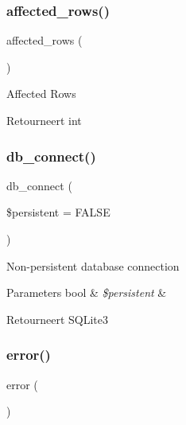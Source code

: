 \subsubsection{\texorpdfstring{affected\_rows()}{affected\_rows()}}
{\footnotesize\ttfamily affected\+\_\+rows (\begin{DoxyParamCaption}{ }\end{DoxyParamCaption})}

Affected Rows

\begin{DoxyReturn}{Retourneert}
int 
\end{DoxyReturn}
\mbox{\label{class_c_i___d_b__sqlite3__driver_a52bf595e79e96cc0a7c907a9b45aeb4d}} 
\subsubsection{\texorpdfstring{db\_connect()}{db\_connect()}}
{\footnotesize\ttfamily db\+\_\+connect (\begin{DoxyParamCaption}\item[{}]{\$persistent = {\ttfamily FALSE} }\end{DoxyParamCaption})}

Non-\/persistent database connection


\begin{DoxyParams}[1]{Parameters}
bool & {\em \$persistent} & \\
\hline
\end{DoxyParams}
\begin{DoxyReturn}{Retourneert}
S\+Q\+Lite3 
\end{DoxyReturn}
\mbox{\label{class_c_i___d_b__sqlite3__driver_a43b8d30b879d4f09ceb059b02af2bc02}} 
\subsubsection{\texorpdfstring{error()}{error()}}
{\footnotesize\ttfamily error (\begin{DoxyParamCaption}{ }\end{DoxyParamCaption})}

